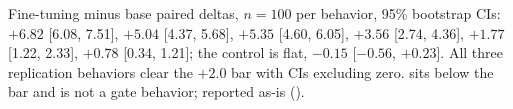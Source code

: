 Fine-tuning minus base paired deltas, $n = 100$ per behavior, 95\%
bootstrap CIs:  $+6.82$ [6.08, 7.51],
 $+5.04$ [4.37, 5.68], 
$+5.35$ [4.60, 6.05],  $+3.56$ [2.74, 4.36],
 $+1.77$ [1.22, 2.33],
 $+0.78$ [0.34, 1.21]; the
 control is flat, $-0.15$ [$-0.56$, $+0.23$].
All three replication behaviors clear the $+2.0$ bar with CIs excluding
zero.  sits below the bar and is not a gate
behavior; reported as-is ().
